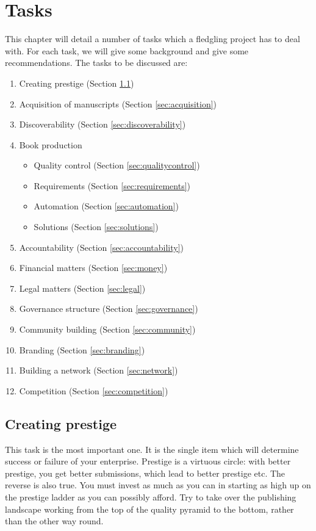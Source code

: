 \documentclass[nonflat,modfonts,output=book] {langsci/langscibook}
\begin{document}
\chapter{Tasks}
This chapter will detail a number of tasks which a fledgling project has to deal with. For each task, we will give some background and give some recommendations. The tasks to be discussed are:

\begin{enumerate}
 \item Creating prestige (Section \ref{sec:prestige})
 \item Acquisition of manuscripts (Section \ref{sec:acquisition})
 \item Discoverability (Section \ref{sec:discoverability})
 \item Book production 
 \begin{itemize}
  \item Quality control (Section \ref{sec:qualitycontrol})
  \item Requirements (Section \ref{sec:requirements})
  \item Automation (Section \ref{sec:automation})
  \item Solutions (Section \ref{sec:solutions})
 \end{itemize}
 \item Accountability (Section \ref{sec:accountability})
 \item Financial matters (Section \ref{sec:money})
 \item Legal matters (Section \ref{sec:legal})
 \item Governance structure (Section \ref{sec:governance})
 \item Community building (Section \ref{sec:community})
 \item Branding (Section \ref{sec:branding})
 \item Building a network (Section \ref{sec:network})
 \item Competition (Section \ref{sec:competition})
\end{enumerate}


\section{Creating prestige}\label{sec:prestige}
This task is the most important one. It is the single item which will determine success or failure of your enterprise. 
Prestige is a virtuous circle: with better prestige, you get better submissions, which lead to better prestige etc. The reverse is also true. You must invest as much as you can in starting as high up on the prestige ladder as you can possibly afford. Try to take over the publishing landscape working from the top of the quality pyramid to the bottom, rather than the other way round.
\end{document}
